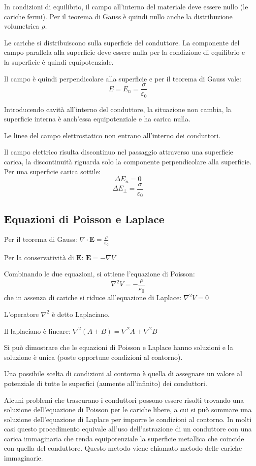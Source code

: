 \documentclass{article}
\begin{document}
In condizioni di equilibrio, il campo all'interno del materiale deve essere nullo (le cariche fermi). Per il teorema di Gauss è quindi nullo anche la distribuzione volumetrica \( \rho \).

Le cariche si distribuiscono sulla superficie del conduttore. La componente del campo parallela alla superficie deve essere nulla per la condizione di equilibrio e la superficie è quindi equipotenziale.

Il campo è quindi perpendicolare alla superficie e per il teorema di Gauss vale:
\[
E = E_n = \frac{\sigma}{\varepsilon_0}
\]

Introducendo cavità all'interno del conduttore, la situazione non cambia, la superficie interna è anch'essa equipotenziale e ha carica nulla.

Le linee del campo elettrostatico non entrano all'interno dei conduttori.

Il campo elettrico risulta discontinuo nel passaggio attraverso una superficie carica, la discontinuità riguarda solo la componente perpendicolare alla superficie. Per una superficie carica sottile:
\[
\Delta E_n = 0
\]
\[
\Delta E_\perp = \frac{\sigma}{\varepsilon_0}
\]



\subsection*{Equazioni di Poisson e Laplace}

Per il teorema di Gauss: \( \nabla \cdot \mathbf{E} = \frac{\rho}{\varepsilon_0} \)

Per la conservatività di \( \mathbf{E} \): \( \mathbf{E} = -\nabla V \)

Combinando le due equazioni, si ottiene l'equazione di Poisson:
\[
\nabla^2 V = -\frac{\rho}{\varepsilon_0}
\]
che in assenza di cariche si riduce all'equazione di Laplace: \( \nabla^2 V = 0 \)

L'operatore \( \nabla^2 \) è detto Laplaciano.

Il laplaciano è lineare: \( \nabla^2(A+B) = \nabla^2A + \nabla^2B \)

Si può dimostrare che le equazioni di Poisson e Laplace hanno soluzioni e la soluzione è unica (poste opportune condizioni al contorno).

Una possibile scelta di condizioni al contorno è quella di assegnare un valore al potenziale di tutte le superfici (aumente all'infinito) dei conduttori.

Alcuni problemi che trascurano i conduttori possono essere risolti trovando una soluzione dell'equazione di Poisson per le cariche libere, a cui si può sommare una soluzione dell'equazione di Laplace per imporre le condizioni al contorno. In molti casi questo procedimento equivale all'uso dell'astrazione di un conduttore con una carica immaginaria che renda equipotenziale la superficie metallica che coincide con quella del conduttore. Questo metodo viene chiamato metodo delle cariche immaginarie.
\end{document}

